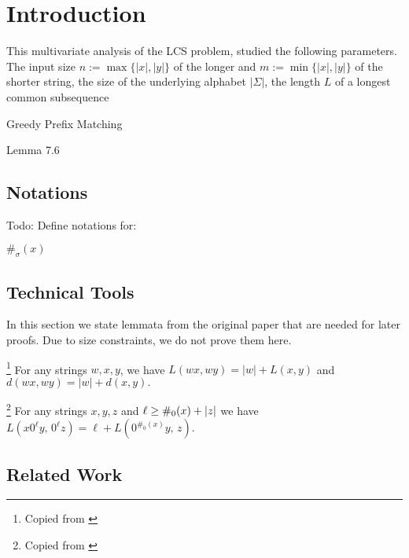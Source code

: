 \section{Introduction}

This multivariate analysis of the LCS problem, studied the following parameters.
The input size $n := \max\{|x|, |y|\}$ of the longer and $m := \min\{|x|, |y|\}$ of the shorter string, the size of the underlying alphabet $|\Sigma|$, the length $L$ of a longest common subsequence



Greedy Prefix Matching


Lemma 7.6


\subsection{Notations}
Todo: Define notations for:

$\#_\sigma(x)$


\subsection{Technical Tools}
In this section we state lemmata from the original paper that are needed for later proofs.
Due to size constraints, we do not prove them here.

\begin{lemma}\footnote{Copied from \cite[Lemma 7.1]{Bringman.2018}}
\label{lem:greedy_prefix_match}
For any strings $w, x, y$, we have
\(
L(wx, wy) = |w| + L(x, y)
\)
and
\(
d(wx, wy) = |w| + d(x, y).
\)
\end{lemma}

\begin{lemma}\footnote{Copied from \cite[Lemma 7.6]{Bringman.2018}}
\label{lem:guards}
For any strings $x, y, z$ and $\ell \geq \#_{0}(x) + |z|$ we have
\(
L\left(x0^{\ell}y,\,0^{\ell}z\right) = \ell + L\left(0^{\#_{0}(x)}y,\,z\right).
\)
\end{lemma}

\subsection{Related Work}

